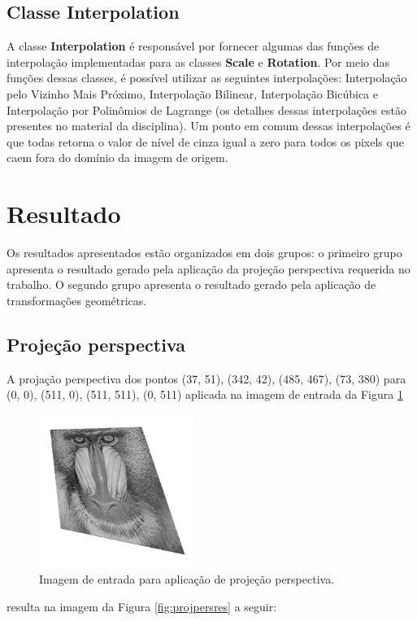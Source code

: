 \documentclass{article}
\begin{document}
\subsection{Classe Interpolation}
A classe \textbf{Interpolation} é responsável por fornecer algumas das funções de interpolação implementadas para as classes \textbf{Scale} e \textbf{Rotation}. Por meio das funções dessas classes, é possível utilizar as seguintes interpolações: Interpolação pelo Vizinho Mais Próximo, Interpolação Bilinear, Interpolação Bicúbica e Interpolação por Polinômios de Lagrange (os detalhes dessas interpolações estão presentes no material da disciplina). Um ponto em comum dessas interpolações é que todas retorna o valor de nível de cinza igual a zero para todos os pixels que caem fora do domínio da imagem de origem.


\section{Resultado}
Os resultados apresentados estão organizados em dois grupos: o primeiro grupo apresenta o resultado gerado pela aplicação da projeção perspectiva requerida no trabalho. O segundo grupo apresenta o resultado gerado pela aplicação de transformações geométricas. 


\subsection{Projeção perspectiva}
A projação perspectiva dos pontos (37, 51), (342, 42), (485, 467), (73, 380) para (0, 0), (511, 0),
(511, 511), (0, 511) aplicada na imagem de entrada da Figura \ref{fig:projpers}

\begin{figure}[!htp]%
	\centering
	\includegraphics[width=5cm]{baboon_perspectiva.png}
	\caption{Imagem de entrada para aplicação de projeção perspectiva.}%
	\label{fig:projpers}%
\end{figure}

\noindent
resulta na imagem da Figura \ref{fig:projpersres} a seguir:
\end{document}
